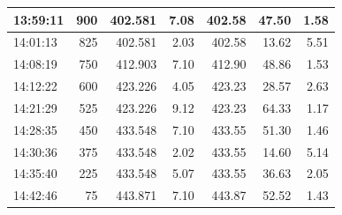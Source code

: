 \begin{table}[ht!]
\begin{adjustbox}{max width=\textwidth}
\begin{tabular}{|l|r|r|r|r|r|r|}
13:59:11 &                900 &         402.581 &       7.08 &         402.58 &    47.50 &  1.58 \\ \hline
14:01:13 &                825 &         402.581 &       2.03 &         402.58 &    13.62 &  5.51 \\ \hline
14:08:19 &                750 &         412.903 &       7.10 &         412.90 &    48.86 &  1.53 \\ \hline
14:12:22 &                600 &         423.226 &       4.05 &         423.23 &    28.57 &  2.63 \\ \hline
14:21:29 &                525 &         423.226 &       9.12 &         423.23 &    64.33 &  1.17 \\ \hline
14:28:35 &                450 &         433.548 &       7.10 &         433.55 &    51.30 &  1.46 \\ \hline
14:30:36 &                375 &         433.548 &       2.02 &         433.55 &    14.60 &  5.14 \\ \hline
14:35:40 &                225 &         433.548 &       5.07 &         433.55 &    36.63 &  2.05 \\ \hline
14:42:46 &                 75 &         443.871 &       7.10 &         443.87 &    52.52 &  1.43 \\ \hline


\end{tabular}
\label{table:cop_heating_and_comp}
\end{adjustbox}
\end{table}

